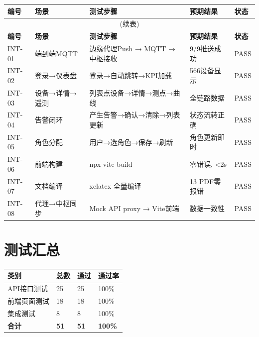 \documentclass[11pt,a4paper]{ctexart}
\begin{document}
\begin{longtable}{p{1.5cm} p{3cm} p{5cm} p{2.5cm} p{2cm}}
\toprule
\textbf{编号} & \textbf{场景} & \textbf{测试步骤} & \textbf{预期结果} & \textbf{状态} \\
\midrule
\endfirsthead
\multicolumn{5}{c}{(续表)} \\
\toprule
\textbf{编号} & \textbf{场景} & \textbf{测试步骤} & \textbf{预期结果} & \textbf{状态} \\
\midrule
\endhead
INT-01 & 端到端MQTT & 边缘代理Push → MQTT → 中枢接收 & 9/9推送成功 & PASS \\
INT-02 & 登录→仪表盘 & 登录→自动跳转→KPI加载 & 566设备显示 & PASS \\
INT-03 & 设备→详情→遥测 & 列表点设备→详情→测点→曲线 & 全链路数据 & PASS \\
INT-04 & 告警闭环 & 产生告警→确认→清除→列表更新 & 状态流转正确 & PASS \\
INT-05 & 角色分配 & 用户→选角色→保存→刷新 & 角色更新即时 & PASS \\
INT-06 & 前端构建 & npx vite build & 零错误, <2s & PASS \\
INT-07 & 文档编译 & xelatex 全量编译 & 13 PDF零报错 & PASS \\
INT-08 & 代理→中枢同步 & Mock API proxy → Vite前端 & 数据一致性 & PASS \\
\bottomrule
\end{longtable}

\section{测试汇总}

\begin{table}[H]\centering
\begin{tabular}{p{3cm} p{3cm} p{3cm} p{3cm}}
\toprule
\textbf{类别} & \textbf{总数} & \textbf{通过} & \textbf{通过率} \\
\midrule
API接口测试 & 25 & 25 & 100\% \\
前端页面测试 & 18 & 18 & 100\% \\
集成测试 & 8 & 8 & 100\% \\
\midrule
\textbf{合计} & \textbf{51} & \textbf{51} & \textbf{100\%} \\
\bottomrule
\end{tabular}
\end{table}
\end{document}
